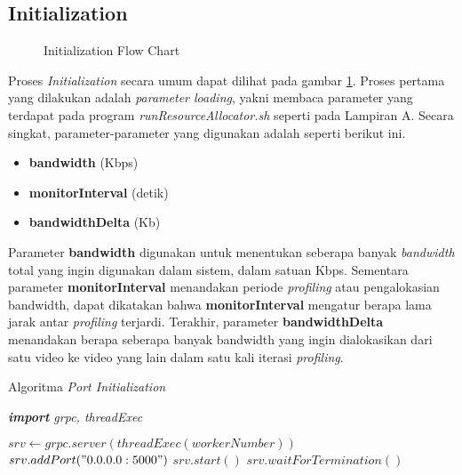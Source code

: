     \subsection{Initialization}

        \begin{figure}[tbh]
            \centering
            
            \caption{Initialization Flow Chart}\label{fig:initialization}
        \end{figure}    

        Proses \textit{Initialization} secara umum dapat dilihat pada gambar \ref{fig:initialization}. Proses pertama yang dilakukan adalah \textit{parameter loading}, yakni membaca parameter yang terdapat pada program \textit{runResourceAllocator.sh} seperti pada Lampiran A.
        Secara singkat, parameter-parameter yang digunakan adalah seperti berikut ini.

        \begin{itemize}
            \item \textbf{bandwidth} (Kbps)
            \item \textbf{monitorInterval} (detik) 
            \item \textbf{bandwidthDelta} (Kb)
        \end{itemize}

        Parameter \textbf{bandwidth} digunakan untuk menentukan seberapa banyak \textit{bandwidth} total yang ingin digunakan dalam sistem, dalam satuan Kbps.
        Sementara parameter \textbf{monitorInterval} menandakan periode \textit{profiling} atau pengalokasian bandwidth, dapat dikatakan bahwa \textbf{monitorInterval} mengatur berapa lama jarak antar \textit{profiling} terjardi. 
        Terakhir, parameter \textbf{bandwidthDelta} menandakan berapa seberapa banyak bandwidth yang ingin dialokasikan dari satu video ke video yang lain dalam satu kali iterasi \textit{profiling}.

        \begin{algorithm}[tbh]
        \caption{Algoritma \textit{Port Initialization}}\label{alg:portInit}
        \textit{\textbf{import} grpc, threadExec}
        \begin{algorithmic}[1]
                \State $srv \gets grpc.server(threadExec(workerNumber))$
                \State $srv.addPort("0.0.0.0:5000")$
                \State $srv.start()$
                \State $srv.waitForTermination()$
            \EndProcedure
        \end{algorithmic}
        \end{algorithm}

